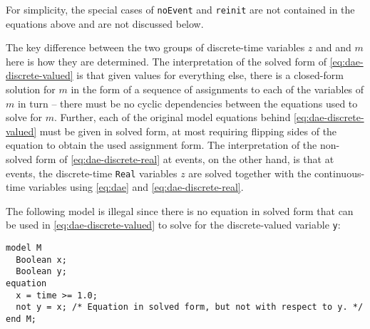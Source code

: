 For simplicity, the special cases of \lstinline!noEvent! and \lstinline!reinit! are not contained in the equations above and are not discussed below.

The key difference between the two groups of discrete-time variables $z$ and and $m$ here is how they are determined.
The interpretation of the solved form of \eqref{eq:dae-discrete-valued} is that given values for everything else, there is a closed-form solution for $m$ in the form of a sequence of assignments to each of the variables of $m$ in turn -- there must be no cyclic dependencies between the equations used to solve for $m$.
Further, each of the original model equations behind \eqref{eq:dae-discrete-valued} must be given in solved form, at most requiring flipping sides of the equation to obtain the used assignment form.
The interpretation of the non-solved form of \eqref{eq:dae-discrete-real} at events, on the other hand, is that at events, the discrete-time \lstinline!Real! variables $z$ are solved together with the continuous-time variables using \eqref{eq:dae} and \eqref{eq:dae-discrete-real}.

\begin{example}
The following model is illegal since there is no equation in solved form that can be used in \eqref{eq:dae-discrete-valued} to solve for the discrete-valued variable \lstinline!y!:
\begin{lstlisting}[language=modelica]
model M
  Boolean x;
  Boolean y;
equation
  x = time >= 1.0;
  not y = x; /* Equation in solved form, but not with respect to y. */
end M;
\end{lstlisting}
\end{example}

